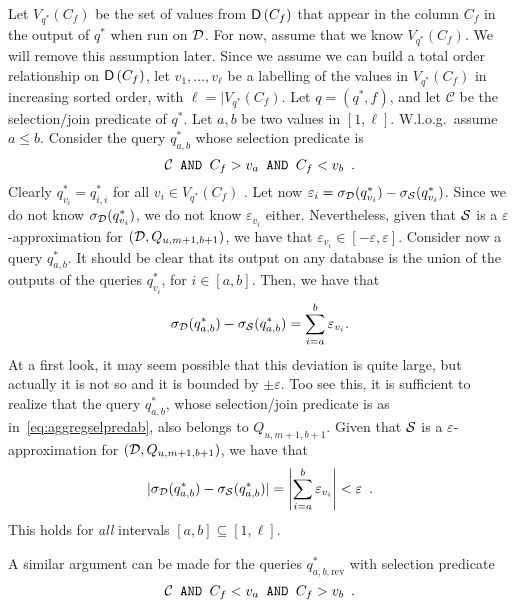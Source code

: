 Let $V_{q^*}(C_f)$ be the set of values from $\mathsf{D}\left(C_f\right)$ that appear in the
column $C_f$ in the output of $q^*$ when run on ${\cal D}$. For now, assume that we
know $V_{q^*}(C_f)$. We will remove this assumption later. Since we assume we
can build a total order relationship on $\mathsf{D}\left(C_f\right)$, let $v_1,\dotsc,v_\ell$
be a labelling of the values in $V_{q^*}(C_f)$ in increasing sorted order, with
$\ell=|V_{q^*}(C_f)$. Let
$q=(q^*,f)$, and let $\mathcal{C}$ be the selection/join predicate of $q^*$. Let
$a,b$ be two values in $[1,\ell]$. W.l.o.g.~assume $a\le b$. Consider the
query $q^*_{a,b}$ whose selection predicate is
\begin{equation}\label{eq:aggregselpredab}
\mathcal{C} \text{\texttt{ AND }} C_f > v_a \text{\texttt{ AND }} C_f < v_b\enspace.
\end{equation}
Clearly $q^*_{v_i}=q^*_{i,i}$ for all $v_i\in V_{q^*}(C_f)$ . Let now
$\varepsilon_i=\sigma_{\cal D}(q^*_{v_i})-\sigma_{\cal S}(q^*_{v_i})$. Since we
do not know $\sigma_{\cal D}(q^*_{v_i})$, we do not know $\varepsilon_{v_i}$ either.
Nevertheless, given that ${\cal S}$ is a $\varepsilon$-approximation for
$({\cal D},Q_{u,m+1,b+1})$, we have that
$\varepsilon_{v_i}\in[-\varepsilon,\varepsilon]$. Consider now a query $q^*_{a,b}$.
It should be clear that its output on any database is the union of the outputs
of the queries $q^*_{v_i}$, for $i\in[a,b]$. Then, we have that
\[
\sigma_{\cal D}(q^*_{a,b})-\sigma_{\cal S}(q^*_{a,b})=\sum_{i=a}^b\varepsilon_{v_i}.
\]
At a first look, it may seem possible that this deviation is quite large, but
actually it is not so and it is bounded by $\pm\varepsilon$. Too see this, it is
sufficient to realize that the query $q^*_{a,b}$, whose selection/join predicate
is as in~\eqref{eq:aggregselpredab}, also belongs to $Q_{u,m+1,b+1}$.
Given that ${\cal S}$ is a $\varepsilon$-approximation for $({\cal D},Q_{u,m+1,b+1})$, we
have that 
\begin{equation}\label{eq:constraints1}
|\sigma_{\cal D}(q^*_{a,b})-\sigma_{\cal S}(q^*_{a,b})|=\left|\sum_{i=a}^b\varepsilon_{v_i}\right|<\varepsilon\enspace.
\end{equation}
This holds for \emph{all} intervals $[a,b]\subseteq[1,\ell]$.

A similar argument can be made for the queries $q^*_{a,b,\mathrm{rev}}$ with
selection predicate
\[
\mathcal{C} \text{\texttt{ AND }} C_f < v_a \text{\texttt{ AND }} C_f > v_b\enspace.
\]

